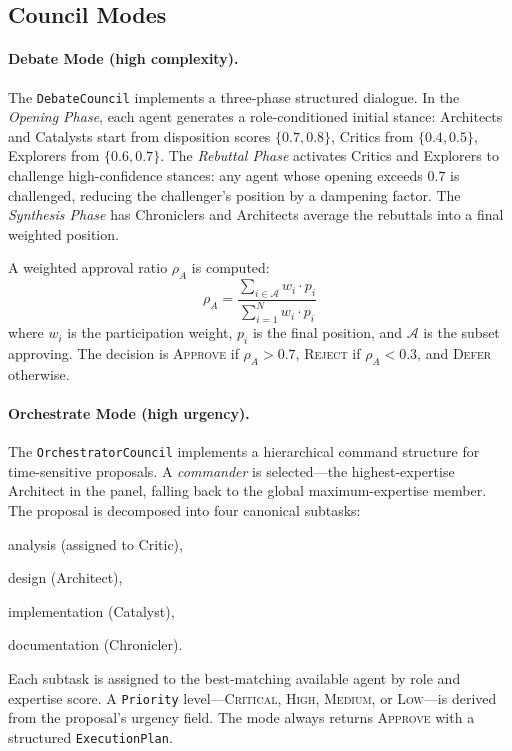\documentclass[11pt]{article}
\begin{document}
\subsection{Council Modes}

\paragraph{Debate Mode (high complexity).}
The \texttt{DebateCouncil} implements a three-phase structured dialogue. In the
\emph{Opening Phase}, each agent generates a role-conditioned initial stance:
Architects and Catalysts start from disposition scores $\{0.7, 0.8\}$, Critics
from $\{0.4, 0.5\}$, Explorers from $\{0.6, 0.7\}$. The \emph{Rebuttal Phase}
activates Critics and Explorers to challenge high-confidence stances: any agent
whose opening exceeds $0.7$ is challenged, reducing the challenger's position by
a dampening factor. The \emph{Synthesis Phase} has Chroniclers and Architects
average the rebuttals into a final weighted position.

A weighted approval ratio $\rho_A$ is computed:
\begin{equation}
  \rho_A = \frac{\sum_{i \in \mathcal{A}} w_i \cdot p_i}
                {\sum_{i=1}^{N} w_i \cdot p_i}
\end{equation}
where $w_i$ is the participation weight, $p_i$ is the final position, and
$\mathcal{A}$ is the subset approving. The decision is \textsc{Approve} if
$\rho_A > 0.7$, \textsc{Reject} if $\rho_A < 0.3$, and \textsc{Defer} otherwise.

\paragraph{Orchestrate Mode (high urgency).}
The \texttt{OrchestratorCouncil} implements a hierarchical command structure for
time-sensitive proposals. A \emph{commander} is selected---the highest-expertise
Architect in the panel, falling back to the global maximum-expertise member. The
proposal is decomposed into four canonical subtasks:
\begin{enumerate*}[label=(\roman*)]
  \item analysis (assigned to Critic),
  \item design (Architect),
  \item implementation (Catalyst),
  \item documentation (Chronicler).
\end{enumerate*}
Each subtask is assigned to the best-matching available agent by role and
expertise score. A \texttt{Priority} level---\textsc{Critical}, \textsc{High},
\textsc{Medium}, or \textsc{Low}---is derived from the proposal's urgency field.
The mode always returns \textsc{Approve} with a structured \texttt{ExecutionPlan}.
\end{document}
